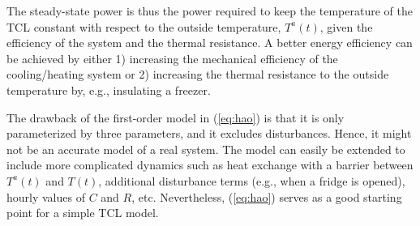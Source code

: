 The steady-state power is thus the power required to keep the temperature of the TCL constant with respect to the outside temperature, $T^{a}(t)$, given the efficiency of the system and the thermal resistance. A better energy efficiency can be achieved by either 1) increasing the mechanical efficiency of the cooling/heating system or 2) increasing the thermal resistance to the outside temperature by, e.g., insulating a freezer.

The drawback of the first-order model in (\ref{eq:hao}) is that it is only parameterized by three parameters, and it excludes disturbances. Hence, it might not be an accurate model of a real system. The model can easily be extended to include more complicated dynamics such as heat exchange with a barrier between $T^{a}(t)$ and $T(t)$, additional disturbance terms (e.g., when a fridge is opened), hourly values of $C$ and $R$, etc. Nevertheless, (\ref{eq:hao}) serves as a good starting point for a simple TCL model.
